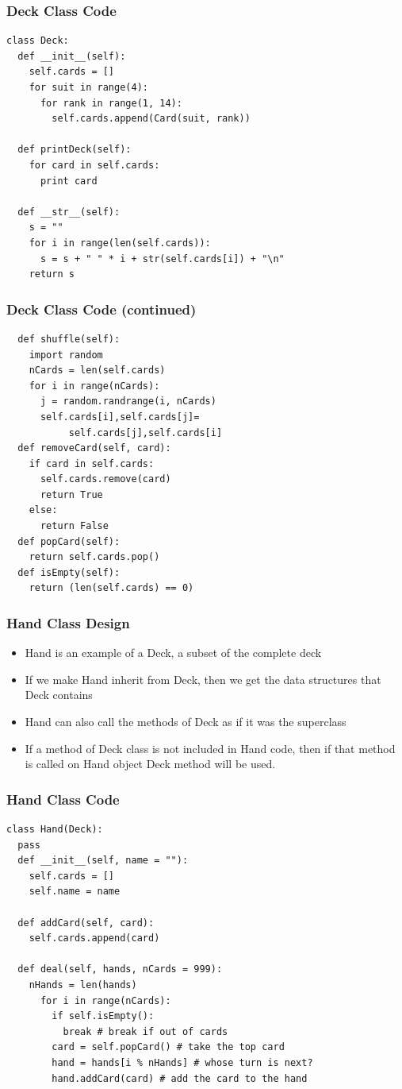 \documentclass{beamer}
\begin{document}
\begin{frame}[fragile]
\frametitle{Deck Class Code}
\begin{lstlisting}
class Deck:
  def __init__(self):
    self.cards = []
    for suit in range(4):
      for rank in range(1, 14):
        self.cards.append(Card(suit, rank))

  def printDeck(self):
    for card in self.cards:
      print card 

  def __str__(self):
    s = ""
    for i in range(len(self.cards)):
      s = s + " " * i + str(self.cards[i]) + "\n"
    return s

\end{lstlisting}
\end{frame}

\begin{frame}[fragile]
\frametitle{Deck Class Code (continued)}
\fontvi
\begin{lstlisting}
  def shuffle(self):
    import random
    nCards = len(self.cards)
    for i in range(nCards):
      j = random.randrange(i, nCards)
      self.cards[i],self.cards[j]=
           self.cards[j],self.cards[i]
  def removeCard(self, card):
    if card in self.cards:
      self.cards.remove(card)
      return True
    else:
      return False
  def popCard(self):
    return self.cards.pop()
  def isEmpty(self):
    return (len(self.cards) == 0)
\end{lstlisting}
\end{frame}

\begin{frame}[fragile]
\frametitle{Hand Class Design}
\begin{itemize}
\item Hand is an example of a Deck, a subset of the complete deck
\item If we make Hand inherit from Deck, then we get the data structures that Deck contains
\item Hand can also call the methods of Deck as if it was the superclass
\item If a method of Deck class is not included in Hand code, then if that method is called on Hand object Deck method will be used.
\end{itemize} 
\end{frame}

\begin{frame}[fragile]
\frametitle{Hand Class Code}
\fontvi
\begin{lstlisting}
class Hand(Deck):
  pass
  def __init__(self, name = ""):
    self.cards = []
    self.name = name

  def addCard(self, card):
    self.cards.append(card)

  def deal(self, hands, nCards = 999):
    nHands = len(hands)
      for i in range(nCards):
        if self.isEmpty():
          break # break if out of cards
        card = self.popCard() # take the top card
        hand = hands[i % nHands] # whose turn is next?
        hand.addCard(card) # add the card to the hand
\end{lstlisting}
\end{frame}
\end{document}
